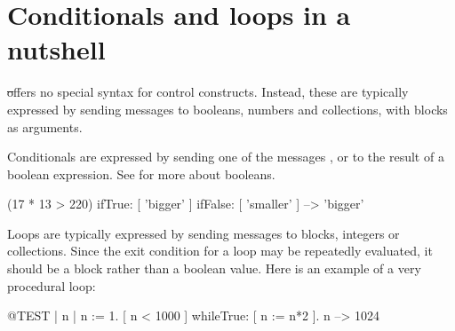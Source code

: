 \documentclass[a4paper,10pt,twoside]{book}
\begin{document}





\section{Conditionals and loops in a nutshell}

\st offers no special syntax for control constructs.
Instead, these are typically expressed by sending messages to booleans, numbers and collections, with blocks as arguments.

Conditionals are expressed by sending one of the messages ,  or  to the result of a boolean expression. See  for more about booleans.

\begin{code}{}
(17 * 13 > 220)
   ifTrue: [ 'bigger' ]
   ifFalse: [ 'smaller' ] --> 'bigger'
\end{code}

Loops are typically expressed by sending messages to blocks, integers or collections.
Since the exit condition for a loop may be repeatedly evaluated, it should be a block rather than a boolean value.
Here is an example of a very procedural loop:

\begin{code}{@TEST | n |}
n := 1.
[ n < 1000 ] whileTrue: [ n := n*2 ].
n --> 1024
\end{code}
\end{document}

